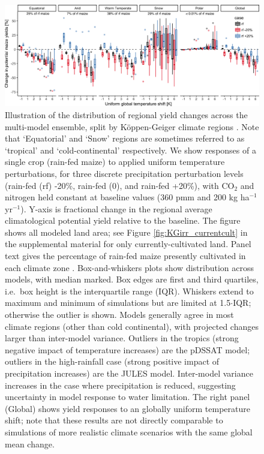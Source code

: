 \documentclass[preprint, 5p, times, twocolumn]{elsarticle}
\begin{document}
\begin{figure}[!!hb]
\centering
   \includegraphics[width=0.99\linewidth]{figures/global_sim_CG.png}
   \caption{Illustration of the distribution of regional yield changes across the multi-model ensemble, split by K\"{o}ppen-Geiger climate regions \citep{rubel2010}. Note that `Equatorial' and `Snow' regions are sometimes referred to as `tropical' and `cold-continental' respectively. We show responses of a single crop (rain-fed maize) to applied uniform temperature perturbations, for three discrete precipitation perturbation levels (rain-fed (rf) -20\%, rain-fed (0), and rain-fed +20\%), with CO$_2$ and nitrogen held constant at baseline values (360 pmm and 200 kg ha$^{-1}$ yr$^{-1}$). Y-axis is fractional change in the regional average climatological potential yield relative to the baseline. The figure shows all modeled land area; see Figure \ref{fig:KGirr_currentcult} in the supplemental material for only currently-cultivated land. Panel text gives the percentage of rain-fed maize presently cultivated in each climate zone \citep[data from][]{Portmann2010}. Box-and-whiskers plots show distribution across models, with median marked. Box edges are first and third quartiles, i.e.\ box height is the interquartile range (IQR). Whiskers extend to maximum and minimum of simulations but are limited at 1.5$\cdot$IQR; otherwise the outlier is shown. Models generally agree in most climate regions (other than cold continental), with projected changes larger than inter-model variance. Outliers in the tropics (strong negative impact of temperature increases) are the pDSSAT model; outliers in the high-rainfall case (strong positive impact of precipitation increases) are the JULES model. Inter-model variance increases in the case where precipitation is reduced, suggesting uncertainty in model response to water limitation. The right panel (Global) shows yield responses to an globally uniform temperature shift; note that these results are not directly comparable to simulations of more realistic climate scenarios with the same global mean change.}
   \label{fig:globesim}
\end{figure}
\end{document}
